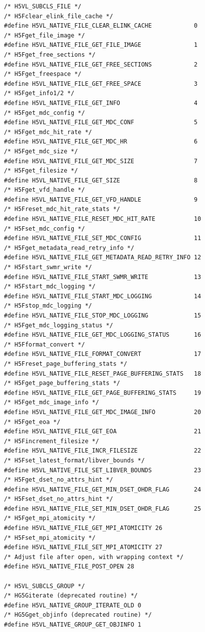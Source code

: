 \begin{lstlisting}
/* H5VL_SUBCLS_FILE */
/* H5Fclear_elink_file_cache */
#define H5VL_NATIVE_FILE_CLEAR_ELINK_CACHE            0  
/* H5Fget_file_image */
#define H5VL_NATIVE_FILE_GET_FILE_IMAGE               1  
/* H5Fget_free_sections */
#define H5VL_NATIVE_FILE_GET_FREE_SECTIONS            2  
/* H5Fget_freespace */
#define H5VL_NATIVE_FILE_GET_FREE_SPACE               3  
/* H5Fget_info1/2 */
#define H5VL_NATIVE_FILE_GET_INFO                     4  
/* H5Fget_mdc_config */
#define H5VL_NATIVE_FILE_GET_MDC_CONF                 5  
/* H5Fget_mdc_hit_rate */
#define H5VL_NATIVE_FILE_GET_MDC_HR                   6  
/* H5Fget_mdc_size */
#define H5VL_NATIVE_FILE_GET_MDC_SIZE                 7  
/* H5Fget_filesize */
#define H5VL_NATIVE_FILE_GET_SIZE                     8  
/* H5Fget_vfd_handle */
#define H5VL_NATIVE_FILE_GET_VFD_HANDLE               9  
/* H5Freset_mdc_hit_rate_stats */
#define H5VL_NATIVE_FILE_RESET_MDC_HIT_RATE           10 
/* H5Fset_mdc_config */
#define H5VL_NATIVE_FILE_SET_MDC_CONFIG               11 
/* H5Fget_metadata_read_retry_info */
#define H5VL_NATIVE_FILE_GET_METADATA_READ_RETRY_INFO 12 
/* H5Fstart_swmr_write */
#define H5VL_NATIVE_FILE_START_SWMR_WRITE             13 
/* H5Fstart_mdc_logging */
#define H5VL_NATIVE_FILE_START_MDC_LOGGING            14 
/* H5Fstop_mdc_logging */
#define H5VL_NATIVE_FILE_STOP_MDC_LOGGING             15 
/* H5Fget_mdc_logging_status */
#define H5VL_NATIVE_FILE_GET_MDC_LOGGING_STATUS       16 
/* H5Fformat_convert */
#define H5VL_NATIVE_FILE_FORMAT_CONVERT               17 
/* H5Freset_page_buffering_stats */
#define H5VL_NATIVE_FILE_RESET_PAGE_BUFFERING_STATS   18 
/* H5Fget_page_buffering_stats */
#define H5VL_NATIVE_FILE_GET_PAGE_BUFFERING_STATS     19 
/* H5Fget_mdc_image_info */
#define H5VL_NATIVE_FILE_GET_MDC_IMAGE_INFO           20 
/* H5Fget_eoa */
#define H5VL_NATIVE_FILE_GET_EOA                      21 
/* H5Fincrement_filesize */
#define H5VL_NATIVE_FILE_INCR_FILESIZE                22 
/* H5Fset_latest_format/libver_bounds */
#define H5VL_NATIVE_FILE_SET_LIBVER_BOUNDS            23 
/* H5Fget_dset_no_attrs_hint */
#define H5VL_NATIVE_FILE_GET_MIN_DSET_OHDR_FLAG       24 
/* H5Fset_dset_no_attrs_hint */
#define H5VL_NATIVE_FILE_SET_MIN_DSET_OHDR_FLAG       25 
/* H5Fget_mpi_atomicity */
#define H5VL_NATIVE_FILE_GET_MPI_ATOMICITY 26 
/* H5Fset_mpi_atomicity */
#define H5VL_NATIVE_FILE_SET_MPI_ATOMICITY 27 
/* Adjust file after open, with wrapping context */
#define H5VL_NATIVE_FILE_POST_OPEN 28         

/* H5VL_SUBCLS_GROUP */
/* HG5Giterate (deprecated routine) */
#define H5VL_NATIVE_GROUP_ITERATE_OLD 0 
/* HG5Gget_objinfo (deprecated routine) */
#define H5VL_NATIVE_GROUP_GET_OBJINFO 1 


\end{lstlisting}
